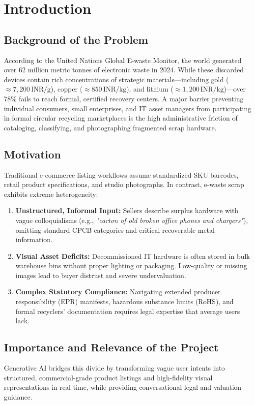 \documentclass[12pt,a4paper]{article}
\begin{document}
\section{Introduction}

\subsection{Background of the Problem}
According to the United Nations Global E-waste Monitor, the world generated over 62 million metric tonnes of electronic waste in 2024. While these discarded devices contain rich concentrations of strategic materials—including gold ($\approx 7,200\,\text{INR/g}$), copper ($\approx 850\,\text{INR/kg}$), and lithium ($\approx 1,200\,\text{INR/kg}$)—over 78\% fails to reach formal, certified recovery centers. A major barrier preventing individual consumers, small enterprises, and IT asset managers from participating in formal circular recycling marketplaces is the high administrative friction of cataloging, classifying, and photographing fragmented scrap hardware.

\subsection{Motivation}
Traditional e-commerce listing workflows assume standardized SKU barcodes, retail product specifications, and studio photographs. In contrast, e-waste scrap exhibits extreme heterogeneity:
\begin{enumerate}
    \item \textbf{Unstructured, Informal Input:} Sellers describe surplus hardware with vague colloquialisms (e.g., \textit{"carton of old broken office phones and chargers"}), omitting standard CPCB categories and critical recoverable metal information.
    \item \textbf{Visual Asset Deficits:} Decommissioned IT hardware is often stored in bulk warehouse bins without proper lighting or packaging. Low-quality or missing images lead to buyer distrust and severe undervaluation.
    \item \textbf{Complex Statutory Compliance:} Navigating extended producer responsibility (EPR) manifests, hazardous substance limits (RoHS), and formal recyclers' documentation requires legal expertise that average users lack.
\end{enumerate}

\subsection{Importance and Relevance of the Project}
Generative AI bridges this divide by transforming vague user intents into structured, commercial-grade product listings and high-fidelity visual representations in real time, while providing conversational legal and valuation guidance.
\end{document}
